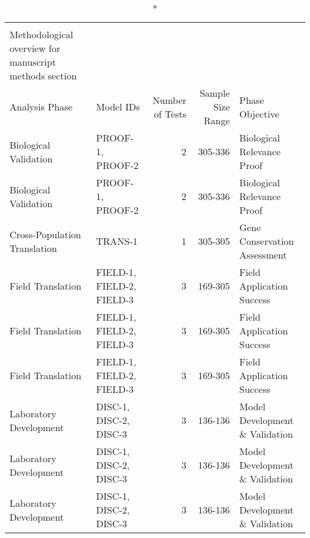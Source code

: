 \begin{longtable}{llrrl}
\caption*{
{\large Statistical Analysis Summary by Phase} \\ 
{\small Methodological overview for manuscript methods section}
} \\ 
\toprule
Analysis Phase & Model IDs & Number of Tests & Sample Size Range & Phase Objective \\ 
\midrule\addlinespace[2.5pt]
Biological Validation & PROOF-1, PROOF-2 & 2 & 305-336 & Biological Relevance Proof \\ 
Biological Validation & PROOF-1, PROOF-2 & 2 & 305-336 & Biological Relevance Proof \\ 
Cross-Population Translation & TRANS-1 & 1 & 305-305 & Gene Conservation Assessment \\ 
Field Translation & FIELD-1, FIELD-2, FIELD-3 & 3 & 169-305 & Field Application Success \\ 
Field Translation & FIELD-1, FIELD-2, FIELD-3 & 3 & 169-305 & Field Application Success \\ 
Field Translation & FIELD-1, FIELD-2, FIELD-3 & 3 & 169-305 & Field Application Success \\ 
Laboratory Development & DISC-1, DISC-2, DISC-3 & 3 & 136-136 & Model Development \& Validation \\ 
Laboratory Development & DISC-1, DISC-2, DISC-3 & 3 & 136-136 & Model Development \& Validation \\ 
Laboratory Development & DISC-1, DISC-2, DISC-3 & 3 & 136-136 & Model Development \& Validation \\ 
\bottomrule
\end{longtable}

